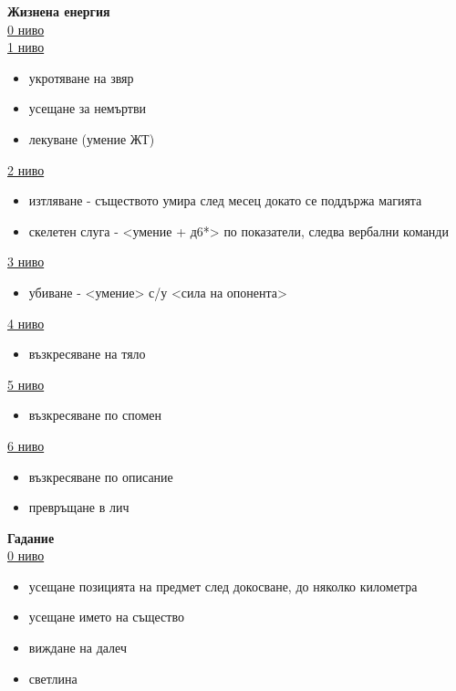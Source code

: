 

\textbf{Жизнена енергия}  \\ 
\underline{0 ниво} \\
\underline{1 ниво} \\
\begin{itemize}
  \item{укротяване на звяр}
  \item{усещане за немъртви}
  \item{лекуване (умение ЖТ)}
\end{itemize}

\underline{2 ниво}
\begin{itemize}
  \item{изтляване - съществото умира след месец  докато се поддържа магията}
  \item{скелетен слуга - <умение + д6*> по показатели, следва вербални команди}
\end{itemize}

\underline{3 ниво}
\begin{itemize}
\item{убиване - <умение> с/у <сила на опонента>}
\end{itemize}

\underline{4 ниво}
\begin{itemize}
\item{възкресяване на тяло}
\end{itemize}

\underline{5 ниво}
\begin{itemize}
\item{възкресяване по спомен}
\end{itemize}

\underline{6 ниво}
\begin{itemize}
\item{възкресяване по описание}
\item{превръщане в лич}
\end{itemize}

\vspace{1cm}
\textbf{Гадание}  \\
\underline{0 ниво}  \\
\begin{itemize}
  \item{усещане позицията на предмет след докосване, до няколко километра}
  \item{усещане името на същество}
  \item{виждане на далеч}
  \item{светлина}
\end{itemize}

